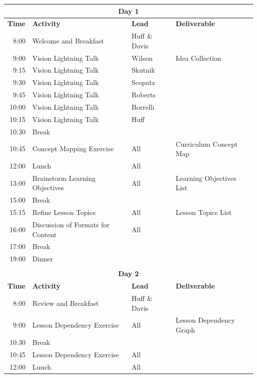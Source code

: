 \documentclass[11pt]{article}
\begin{document}
          \begin{table}[h!]
                  \centering
          \begin{tabularx}{\textwidth}{r|l|l|X}
                                  \multicolumn{4}{c}{\textbf{Day 1}}\\
                                  \hline
                          \textbf{Time}& \textbf{Activity}& \textbf{Lead}& \textbf{Deliverable}\\
                                  \hline
8:00& Welcome and Breakfast& Huff \& Davis& \\
9:00& Vision Lightning Talk& Wilson& Idea Collection\\
9:15& Vision Lightning Talk& Skutnik& \\
9:30& Vision Lightning Talk& Scopatz& \\
9:45& Vision Lightning Talk& Roberts& \\
10:00& Vision Lightning Talk& Borrelli& \\
10:15& Vision Lightning Talk& Huff& \\
10:30& Break&&  \\
10:45& Concept Mapping Exercise& All& Curriculum Concept Map\\
12:00& Lunch& All& \\
13:00& Brainstorm Learning Objectives& All& Learning Objectives List\\
15:00& Break&&  \\
15:15& Refine Lesson Topics& All& Lesson Topics List\\
16:00& Discussion of Formats for Content& All&  \\
17:00& Break&&  \\
19:00& Dinner&&  \\
\hline
                                  \multicolumn{4}{c}{}\\
                                  \multicolumn{4}{c}{\textbf{Day 2}}\\
                                  \hline
                          \textbf{Time}& \textbf{Activity}& \textbf{Lead}& \textbf{Deliverable}\\
                                  \hline
8:00& Review and Breakfast& Huff \& Davis& \\
9:00& Lesson Dependency Exercise& All& Lesson Dependency Graph\\
10:30& Break&&  \\
10:45& Lesson Dependency Exercise& All& \\
12:00& Lunch& All& \\

\end{tabularx}
\end{table}
\end{document}
